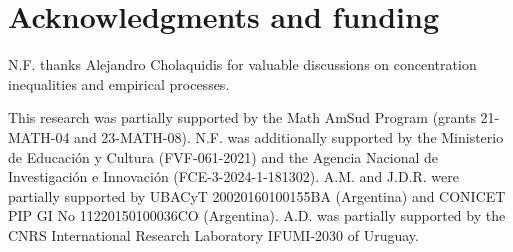 \documentclass[11pt]{amsart}
\theoremstyle{definition}
\theoremstyle{remark}
\numberwithin{equation}{section}
\begin{document}
\section*{Acknowledgments and funding}

N.F. thanks Alejandro Cholaquidis for valuable discussions on concentration inequalities and empirical processes.

This research was partially supported by the Math AmSud Program (grants 21-MATH-04 and 23-MATH-08). 
N.F. was additionally supported by the Ministerio de Educación y Cultura (FVF-061-2021) and the Agencia Nacional de Investigaci\'{o}n e Innovaci\'{o}n (FCE-3-2024-1-181302). 
A.M. and J.D.R. were partially supported by UBACyT 20020160100155BA (Argentina) and CONICET PIP GI No 11220150100036CO (Argentina).
A.D. was partially supported by the CNRS International Research Laboratory
IFUMI-2030 of Uruguay.



\end{document}
